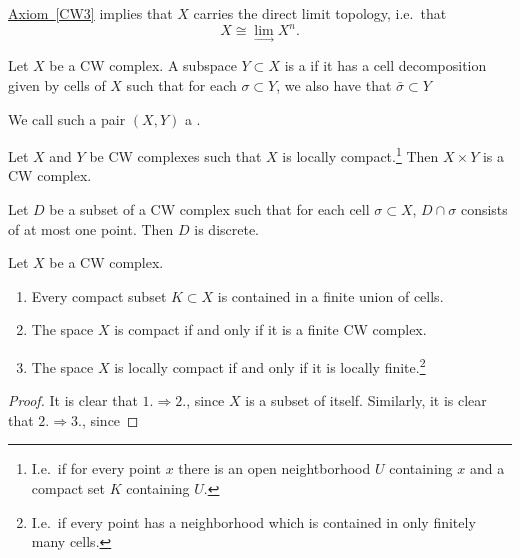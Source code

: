 \documentclass[main.tex]{subfiles}
\begin{document}
\begin{note}
  \hyperref[CW3]{Axiom~\ref*{CW3}} implies that $X$ carries the direct limit topology, i.e.\ that
  \begin{equation*}
    X \cong \lim_{\rightarrow} X^{n}.
  \end{equation*}
\end{note}

\begin{definition}
  \label{def:subcomplex}
  Let $X$ be a CW complex. A subspace $Y \subset X$ is a  if it has a cell decomposition given by cells of $X$ such that for each $\sigma \subset Y$, we also have that $\bar{\sigma} \subset Y$

  We call such a pair $(X, Y)$ a .
\end{definition}

\begin{fact}
  \label{fact:product_of_cw_complexes}
  Let $X$ and $Y$ be CW complexes such that $X$ is locally compact.\footnote{I.e.\ if for every point $x$ there is an open neightborhood $U$ containing $x$ and a compact set $K$ containing $U$.} Then $X \times Y$ is a CW complex.
\end{fact}

\begin{lemma}
  \label{lemma:subset_intersecting_each_cell_once_discrete}
  Let $D$ be a subset of a CW complex such that for each cell $\sigma \subset X$, $D \cap \sigma$ consists of at most one point. Then $D$ is discrete.
\end{lemma}

\begin{corollary}
  Let $X$ be a CW complex.
  \begin{enumerate}
    \item Every compact subset $K \subset X$ is contained in a finite union of cells.

    \item The space $X$ is compact if and only if it is a finite CW complex.

    \item The space $X$ is locally compact if and only if it is locally finite.\footnote{I.e.\ if every point has a neighborhood which is contained in only finitely many cells.}
  \end{enumerate}
\end{corollary}
\begin{proof}
  It is clear that $1. \Rightarrow 2.$, since $X$ is a subset of itself. Similarly, it is clear that $2. \Rightarrow 3.$, since
\end{proof}
\end{document}
